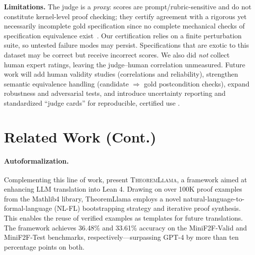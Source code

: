 \documentclass{article}
\begin{document}
\textbf{Limitations.} The judge is a \emph{proxy}: scores are prompt/rubric-sensitive and do not constitute kernel-level proof checking; they certify agreement with a rigorous yet necessarily incomplete gold specification since no complete mechanical checks of specification equivalence exist~\citep{rice1953}.
Our certification relies on a finite perturbation suite, so untested failure modes may persist. Specifications that are exotic to this dataset may be correct but receive incorrect scores.
We also did \emph{not} collect human expert ratings, leaving the judge--human correlation unmeasured.
Future work will add human validity studies (correlations and reliability), strengthen semantic equivalence handling (candidate $\Rightarrow$ gold postcondition checks), expand robustness and adversarial tests, and introduce uncertainty reporting and standardized ``judge cards'' for reproducible, certified use \citep{zhou2025graders}.




\appendix

\section{Related Work (Cont.)}

\paragraph{Autoformalization.} Complementing this line of work, \citet{wang2024theoremLlama} present \textsc{TheoremLlama}, a framework aimed at enhancing LLM translation into Lean 4. Drawing on over 100K proof examples from the Mathlib4 library, TheoremLlama employs a novel natural-language-to-formal-language (NL-FL) bootstrapping strategy and iterative proof synthesis. This enables the reuse of verified examples as templates for future translations. The framework achieves 36.48\% and 33.61\% accuracy on the MiniF2F-Valid and MiniF2F-Test benchmarks, respectively---surpassing GPT-4 by more than ten percentage points on both.
\end{document}
